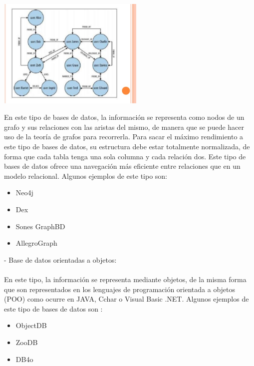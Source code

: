 \documentclass[%
 reprint,
 amsmath,amssymb,
 aps,
]{revtex4-1}
\begin{document}
	\begin{center}
	\includegraphics[width=7cm]{./Imagenes/3}
	\end{center}
En este tipo de bases de datos, la información se representa como nodos de un grafo y sus relaciones con las aristas del mismo, de manera que se puede hacer uso de la teoría de grafos para recorrerla. Para sacar el máximo rendimiento a este tipo de bases de datos, su estructura debe estar totalmente normalizada, de forma que cada tabla tenga una sola columna y cada relación dos. 
Este tipo de bases de datos ofrece una navegación más eficiente entre relaciones que en un modelo relacional. \cite{acens}
Algunos ejemplos de este tipo son:
           \begin{itemize}
		\item Neo4j
		\item Dex
		\item Sones GraphBD
		\item AllegroGraph
	\end{itemize}
-  Base de datos orientadas a objetos:
\\
\\
En este tipo, la información se representa mediante objetos, de la misma forma que son representados en los lenguajes de programación orientada a objetos (POO) como ocurre en JAVA, Cchar o Visual Basic .NET. \cite{acens}
Algunos ejemplos de este tipo de bases de datos son : 

           \begin{itemize}
		\item ObjectDB
		\item ZooDB
		\item DB4o
	\end{itemize}
\end{document}
